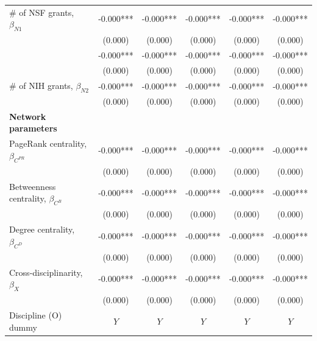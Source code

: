 \documentclass{article}\usepackage[]{graphicx}\usepackage[]{color}
\begin{document}
\begin{table}[h!]
\begin{center}
\begin{tabular}{l c c c c c}
    \rowcolor{gray!50}
    {\#} of NSF grants, $\beta_{N1}$ 
    & -0.000*** & -0.000***  & -0.000*** & -0.000*** & -0.000*** \\
    {} 
    & (0.000)   & (0.000)    & (0.000)   & (0.000)   & (0.000) \\
    
    \rowcolor{gray!50}
    & -0.000*** & -0.000***  & -0.000*** & -0.000*** & -0.000*** \\
    {} 
    & (0.000)   & (0.000)    & (0.000)   & (0.000)   & (0.000) \\
    
    \rowcolor{gray!50}
    {\#} of NIH grants, $\beta_{N2}$ 
    & -0.000*** & -0.000***  & -0.000*** & -0.000*** & -0.000*** \\
    {} 
    & (0.000)   & (0.000)    & (0.000)   & (0.000)   & (0.000) \\
    
    \hline
    
    \textbf {Network parameters}\\
    
    \rowcolor{gray!50}
    PageRank centrality, $\beta_{C^{PR}}$ 
    & -0.000*** & -0.000***  & -0.000*** & -0.000*** & -0.000*** \\
    {} 
    & (0.000)   & (0.000)    & (0.000)   & (0.000)   & (0.000) \\
    
    \rowcolor{gray!50}
    Betweenness centrality, $\beta_{C^{B}}$ 
    & -0.000*** & -0.000***  & -0.000*** & -0.000*** & -0.000*** \\
    {} 
    & (0.000)   & (0.000)    & (0.000)   & (0.000)   & (0.000) \\
    
    \rowcolor{gray!50}
    Degree centrality, $\beta_{C^{D}}$ 
    & -0.000*** & -0.000***  & -0.000*** & -0.000*** & -0.000*** \\
    {} 
    & (0.000)   & (0.000)    & (0.000)   & (0.000)   & (0.000) \\
    
    \rowcolor{gray!50}
    Cross-disciplinarity, $\beta_{X}$ 
    & -0.000*** & -0.000***  & -0.000*** & -0.000*** & -0.000*** \\
    {} 
    & (0.000)   & (0.000)    & (0.000)   & (0.000)   & (0.000) \\
    
    \hline
    
    \rowcolor{gray!50} 
    Discipline (O) dummy & $\textit{Y}$ & $\textit{Y}$ & $\textit{Y}$ & $\textit{Y}$ & $\textit{Y}$ \\
    

\end{tabular}
\end{center}
\end{table}
\end{document}
